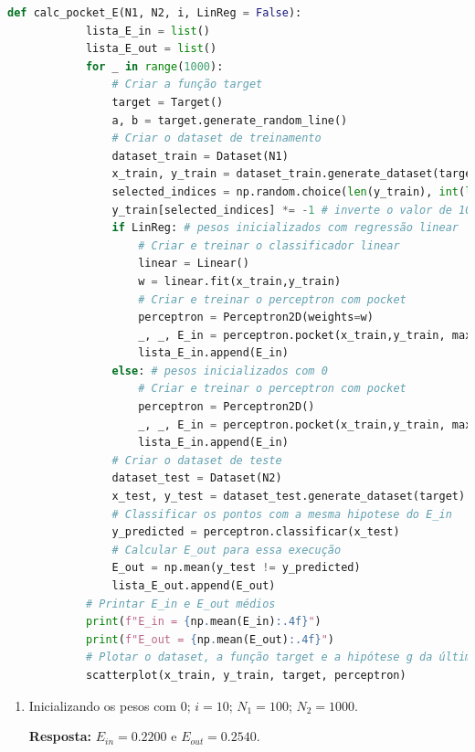 \begin{enumerate}
    \begin{lstlisting}[language=Python, caption=Cálculo do E\_in e do E\_out, label=cod:calc_pocket_E]
        def calc_pocket_E(N1, N2, i, LinReg = False):
            lista_E_in = list()
            lista_E_out = list()
            for _ in range(1000):
                # Criar a função target
                target = Target()
                a, b = target.generate_random_line()
                # Criar o dataset de treinamento
                dataset_train = Dataset(N1)
                x_train, y_train = dataset_train.generate_dataset(target)
                selected_indices = np.random.choice(len(y_train), int(len(y_train) * 0.1), replace=False) # seleciona 10%
                y_train[selected_indices] *= -1 # inverte o valor de 10%
                if LinReg: # pesos inicializados com regressão linear
                    # Criar e treinar o classificador linear
                    linear = Linear()
                    w = linear.fit(x_train,y_train)
                    # Criar e treinar o perceptron com pocket
                    perceptron = Perceptron2D(weights=w)
                    _, _, E_in = perceptron.pocket(x_train,y_train, max_iter = i)
                    lista_E_in.append(E_in)
                else: # pesos inicializados com 0
                    # Criar e treinar o perceptron com pocket
                    perceptron = Perceptron2D()
                    _, _, E_in = perceptron.pocket(x_train,y_train, max_iter = i)
                    lista_E_in.append(E_in)
                # Criar o dataset de teste
                dataset_test = Dataset(N2)
                x_test, y_test = dataset_test.generate_dataset(target)
                # Classificar os pontos com a mesma hipotese do E_in
                y_predicted = perceptron.classificar(x_test)
                # Calcular E_out para essa execução
                E_out = np.mean(y_test != y_predicted)
                lista_E_out.append(E_out)
            # Printar E_in e E_out médios
            print(f"E_in = {np.mean(E_in):.4f}")
            print(f"E_out = {np.mean(E_out):.4f}")
            # Plotar o dataset, a função target e a hipótese g da última execução
            scatterplot(x_train, y_train, target, perceptron)
    \end{lstlisting}

    
    \begin{enumerate}
        \item Inicializando os pesos com 0; $i = 10$; $N_1 = 100$; $N_2 = 1000$.
        
        \textbf{Resposta:} $E_{in} = 0.2200$ e $E_{out} = 0.2540$.


\end{enumerate}
\end{enumerate}
